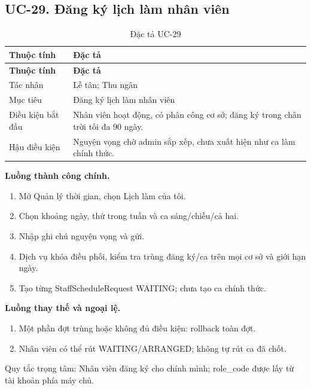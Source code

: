 \clearpage

\subsection{UC-29.\allowbreak{} Đăng ký lịch làm nhân viên}
\label{uc:29}

{\small\setlength{\tabcolsep}{3pt}\renewcommand{\arraystretch}{1.12}
\begin{longtable}{@{}L{\textwidth-1.32pt\relax} L{\textwidth-4.68pt\relax}@{}}
\caption{Đặc tả UC-29}\\
\toprule
\textbf{Thuộc tính} & \textbf{Đặc tả}\\\midrule
\endfirsthead
\toprule
\textbf{Thuộc tính} & \textbf{Đặc tả}\\\midrule
\endhead
\bottomrule\endlastfoot
Tác nhân & Lễ tân; Thu ngân\\[3pt]
Mục tiêu & Đăng ký lịch làm nhân viên\\[3pt]
Điều kiện bắt đầu & Nhân viên hoạt động, có phân công cơ sở; đăng ký trong chân trời tối đa 90 ngày.\allowbreak{}\\[3pt]
Hậu điều kiện & Nguyện vọng chờ admin sắp xếp, chưa xuất hiện như ca làm chính thức.\allowbreak{}\\[3pt]
\end{longtable}}
\noindent\textbf{Luồng thành công chính.}
\begin{enumerate}
\item Mở Quản lý thời gian, chọn Lịch làm của tôi.\allowbreak{}
\item Chọn khoảng ngày, thứ trong tuần và ca sáng/\allowbreak{}chiều/\allowbreak{}cả hai.\allowbreak{}
\item Nhập ghi chú nguyện vọng và gửi.\allowbreak{}
\item Dịch vụ khóa điều phối, kiểm tra trùng đăng ký/\allowbreak{}ca trên mọi cơ sở và giới hạn ngày.\allowbreak{}
\item Tạo từng Staff\allowbreak{}Schedule\allowbreak{}Request WAITING; chưa tạo ca chính thức.\allowbreak{}
\end{enumerate}
\noindent\textbf{Luồng thay thế và ngoại lệ.}
\begin{enumerate}
\item Một phần đợt trùng hoặc không đủ điều kiện:\allowbreak{} rollback toàn đợt.\allowbreak{}
\item Nhân viên có thể rút WAITING/\allowbreak{}ARRANGED; không tự rút ca đã chốt.\allowbreak{}
\end{enumerate}
Quy tắc trọng tâm:\allowbreak{} Nhân viên đăng ký cho chính mình; role\_\allowbreak{}code được lấy từ tài khoản phía máy chủ.\allowbreak{}

